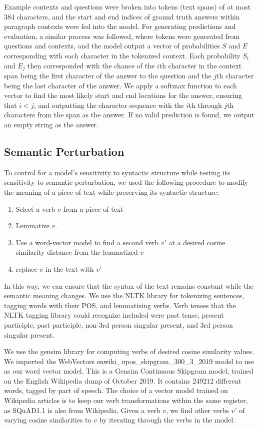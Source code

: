 \documentclass[11pt,a4paper]{article}
\begin{document}
Example contexts and questions were broken into tokens (text spans) of at most 384 characters, and the start and end indices of ground truth answers within paragraph contexts were fed into the model. For generating predictions and evaluation, a similar process was followed, where tokens were generated from questions and contexts, and the model output a vector of probabilities $S$ and $E$ corresponding with each character in the tokenized context. Each probability $S_i$ and $E_j$ then corresponded with the chance of the $i$th character in the context span being the first character of the answer to the question and the $j$th character being the last character of the answer. We apply a softmax function to each vector to find the most likely start and end locations for the answer, ensuring that $i< j$, and outputting the character sequence with the $i$th through $j$th characters from the span as the answer. If no valid prediction is found, we output an empty string as the answer.

\subsection{Semantic Perturbation}
To control for a model's sensitivity to syntactic structure while testing its sensitivity to semantic perturbation, we used the following procedure to modify the meaning of a piece of text while preserving its syntactic structure:
\begin{enumerate}
    \item Select a verb $v$ from a piece of text
    \item Lemmatize $v$. 
    \item Use a word-vector model to find a second verb $v'$ at a desired cosine similarity distance from the lemmatized $v$
    \item replace $v$ in the text with $v'$
\end{enumerate}

In this way, we can ensure that the syntax of the text remains constant while the semantic meaning changes. We use the NLTK library \cite{bird2009natural} for tokenizing sentences, tagging words with their POS, and lemmatizing verbs. Verb tenses that the NLTK tagging library could recognize included were past tense, present participle, past participle, non-3rd person singular present, and 3rd person singular present. 

We use the gensim library \cite{rehurek2011gensim} for computing verbs of desired cosine similarity values. We imported the WebVectors enwiki\_upos\_skipgram\_300\_3\_2019 model
\cite{kutuzov2017word} to use as our word vector model. This is a Gensim Continuous Skipgram model, trained on the English Wikipedia dump of October 2019. It contains $249212$ different words, tagged by part of speech. The choice of a vector model trained on Wikipedia articles is to keep our verb transformations within the same register, as SQuAD1.1 is also from Wikipedia,  Given a verb $v$, we find other verbs $v'$ of varying cosine similarities to $v$ by iterating through the verbs in the model. 
\end{document}
